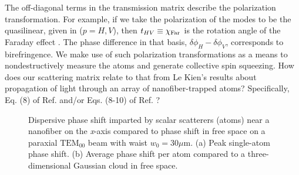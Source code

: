 \documentclass[preprint,aps,pra,onecolumn]{revtex4-1} %
\newcommand{\comment}[1]{{\color{Maroon} #1}}
\begin{document}
The off-diagonal terms in the transmission matrix describe the polarization transformation. For example, if we take the polarization of the modes to be the quasilinear, given in  ($p = H,V$), then $t_{HV} \equiv \chi_{\rm Far}$ is the rotation angle of the Faraday effect \cite{}.  The phase difference in that basis, $\delta  \phi_H - \delta \phi_V$, corresponds to birefringence.  
We make use of such polarization transformations as a means to nondestructively measure the atoms and generate collective spin squeezing.
\comment{How does our scattering matrix relate to that from Le Kien's results about propagation of light through an array of nanofiber-trapped atoms?  Specifically, Eq. (8) of Ref. \cite{le_kien_correlations_2008} and/or Eqs. (8-10) of Ref. \cite{le_kien_propagation_2014}?  
}
\begin{figure}
\begin{minipage}{.49\linewidth}
\centering
{}
\end{minipage}
\caption{Dispersive phase shift imparted by scalar scatterers (atoms) near a nanofiber on the \emph{x}-axis compared to phase shift in free space on a paraxial $\mathrm{TEM}_{00}$ beam with waist $w_0 = 30 \mu$m. (a) Peak single-atom phase shift. (b) Average phase shift per atom compared to a three-dimensional Gaussian cloud in free space. }\label{Fig::PhaseShift}
\end{figure}
\end{document}
